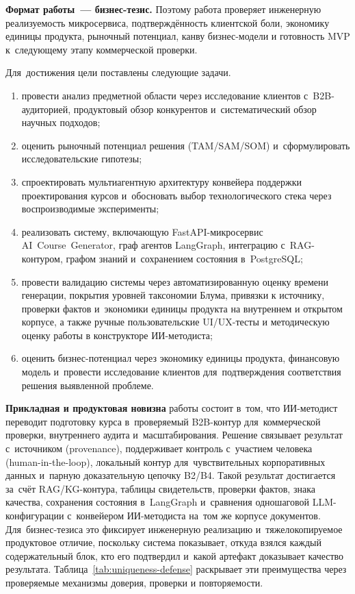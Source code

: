 \textbf{Формат работы~— бизнес-тезис.}
Поэтому работа проверяет инженерную реализуемость микросервиса,
подтверждённость клиентской боли, экономику единицы продукта,
рыночный потенциал, канву бизнес-модели и готовность MVP к~следующему
этапу коммерческой проверки.

Для~достижения цели поставлены следующие задачи.
\begin{enumerate}
  \item провести анализ предметной области через исследование клиентов
    с~B2B-аудиторией,
    продуктовый обзор конкурентов и~систематический обзор научных подходов;
  \item оценить рыночный потенциал решения (TAM/SAM/SOM) и~сформулировать
    исследовательские гипотезы;
  \item спроектировать мультиагентную архитектуру конвейера поддержки
    проектирования курсов
    и~обосновать выбор технологического стека через воспроизводимые эксперименты;
  \item реализовать систему, включающую FastAPI-микросервис AI~Course~Generator,
    граф агентов LangGraph, интеграцию с~RAG-контуром,
    графом знаний и~сохранением состояния в~PostgreSQL;
  \item провести валидацию системы через автоматизированную оценку
    времени генерации, покрытия уровней таксономии Блума,
    привязки к источнику, проверки фактов и~экономики единицы продукта на внутреннем
    и открытом корпусе, а также ручные пользовательские UI/UX-тесты
    и методическую оценку работы в конструкторе ИИ-методиста;
  \item оценить бизнес-потенциал через экономику единицы продукта,
    финансовую модель и~провести исследование клиентов
    для~подтверждения соответствия решения выявленной проблеме.
\end{enumerate}

\textbf{Прикладная и продуктовая новизна} работы состоит в~том, что
ИИ-методист переводит подготовку курса в~проверяемый B2B-контур
для~коммерческой проверки, внутреннего аудита и~масштабирования.
Решение связывает результат с~\mbox{источником} (provenance),
поддерживает контроль с~участием человека (\mbox{human-in-the-loop}),
локальный контур для~чувствительных корпоративных данных и~парную
доказательную цепочку B2/B4. Такой результат достигается за~счёт
RAG/KG-контура, таблицы свидетельств, проверки фактов, знака качества,
сохранения состояния в~LangGraph и~сравнения одношаговой LLM-конфигурации
с~конвейером ИИ-методиста на~том же корпусе документов.
Для~бизнес-тезиса это фиксирует инженерную реализацию и~тяжелокопируемое
продуктовое отличие, поскольку система показывает, откуда взялся каждый
содержательный блок, кто его подтвердил и~какой артефакт доказывает
качество результата.
Таблица~\ref{tab:uniqueness-defense} раскрывает эти преимущества через
проверяемые механизмы доверия, проверки и повторяемости.

